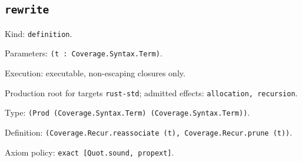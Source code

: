 \documentclass[11pt]{article}
\begin{document}
\subsection*{\texttt{rewrite}}
\noindent Kind: \texttt{definition}.\par
\noindent Parameters: \texttt{(t : Coverage.Syntax.Term)}.\par
\noindent Execution: executable, non-escaping closures only.\par
\noindent Production root for targets \texttt{rust-std}; admitted effects: \texttt{allocation, recursion}.\par
\noindent Type: \texttt{(Prod (Coverage.Syntax.Term) (Coverage.Syntax.Term))}.\par
\noindent Definition: \texttt{(Coverage.Recur.reassociate (t), Coverage.Recur.prune (t))}.\par
\noindent Axiom policy: \texttt{exact [Quot.sound, propext]}.\par
\end{document}
